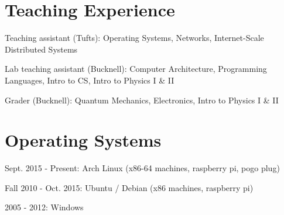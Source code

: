 \documentclass[margin,line]{res}                          %
\newenvironment{list1}{
  \begin{list}{\ding{113}}{%
      \setlength{\itemsep}{0in}
      \setlength{\parsep}{0in} \setlength{\parskip}{0in}
      \setlength{\topsep}{0in} \setlength{\partopsep}{0in}
      \setlength{\leftmargin}{0.17in}}}{\end{list}}
\begin{document}
\begin{resume}
\begin{list1}

\end{list1}

\section{\sc Teaching Experience}
\begin{list1}
\item[] Teaching assistant (Tufts): Operating Systems, Networks, Internet-Scale Distributed Systems
\item[] Lab teaching assistant (Bucknell): Computer Architecture, Programming Languages, Intro to CS,
        Intro to Physics I \& II
\item[] Grader (Bucknell): Quantum Mechanics, Electronics, Intro to Physics I \& II
\end{list1}

\section{\sc Operating Systems}
\begin{list1}
\item[] Sept. 2015 - Present: Arch Linux (x86-64 machines, raspberry pi, pogo plug)
\item[] Fall 2010 - Oct. 2015: Ubuntu / Debian (x86 machines, raspberry pi)
\item[] 2005 - 2012: Windows
\end{list1}


\end{resume}
\end{document}
